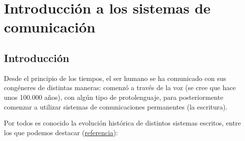 \chapter{Introducción a los sistemas de comunicación}

\section{Introducción}

Desde el principio de los tiempos, el ser humano se ha comunicado con sus congéneres de distintas maneras: comenzó a través de la voz (se cree que hace unos 100.000 años), con algún tipo de protolenguaje, para posteriormente comenzar a utilizar sistemas de comunicaciones permanentes (la escritura).

Por todos es conocido la evolución histórica de distintos sistemas escritos, entre los que podemos destacar (\href{https://es.wikipedia.org/wiki/Anexo:Cronolog%C3%ADa_de_las_tecnolog%C3%ADas_de_la_comunicaci%C3%B3n}{referencia}):
